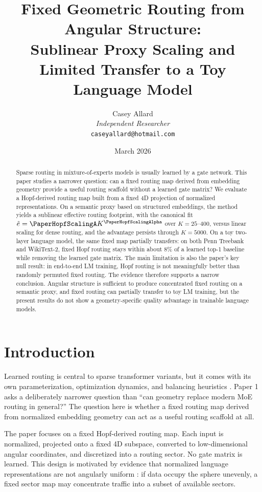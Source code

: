 \documentclass[10pt,twocolumn]{article}
\title{\textbf{Fixed Geometric Routing from Angular Structure:\\Sublinear Proxy Scaling and Limited Transfer to a Toy Language Model}}
\author{Casey Allard\\\textit{Independent Researcher}\\\texttt{caseyallard@hotmail.com}}
\date{March 2026}
\begin{document}
\maketitle

\begin{abstract}
Sparse routing in mixture-of-experts models is usually learned by a gate network. This paper studies a narrower question: can a fixed routing map derived from embedding geometry provide a useful routing scaffold without a learned gate matrix? We evaluate a Hopf-derived routing map built from a fixed 4D projection of normalized representations. On a semantic proxy based on structured embeddings, the method yields a sublinear effective routing footprint, with the canonical fit $\hat{e}= \PaperHopfScalingA K^{\PaperHopfScalingAlpha}$ over $K=25$--$400$, versus linear scaling for dense routing, and the advantage persists through $K=5000$. On a toy two-layer language model, the same fixed map partially transfers: on both Penn Treebank and WikiText-2, fixed Hopf routing stays within about $8\%$ of a learned top-1 baseline while removing the learned gate matrix. The main limitation is also the paper's key null result: in end-to-end LM training, Hopf routing is not meaningfully better than randomly permuted fixed routing. The evidence therefore supports a narrow conclusion. Angular structure is sufficient to produce concentrated fixed routing on a semantic proxy, and fixed routing can partially transfer to toy LM training, but the present results do not show a geometry-specific quality advantage in trainable language models.
\end{abstract}

\section{Introduction}
Learned routing is central to sparse transformer variants, but it comes with its own parameterization, optimization dynamics, and balancing heuristics \citep{shazeer2017outrageously,fedus2022switch}. Paper 1 asks a deliberately narrower question than ``can geometry replace modern MoE routing in general?'' The question here is whether a fixed routing map derived from normalized embedding geometry can act as a useful routing scaffold at all.

The paper focuses on a fixed Hopf-derived routing map. Each input is normalized, projected onto a fixed 4D subspace, converted to low-dimensional angular coordinates, and discretized into a routing sector. No gate matrix is learned. This design is motivated by evidence that normalized language representations are not angularly uniform \citep{turboquant2026}: if data occupy the sphere unevenly, a fixed sector map may concentrate traffic into a subset of available sectors.
\end{document}
